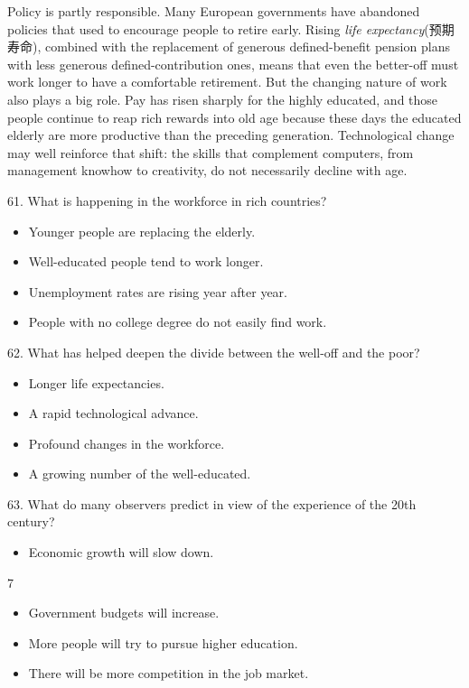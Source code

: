 \documentclass[UTF8,11pt]{ctexart}
\begin{document}
Policy is partly responsible. Many European governments have abandoned policies that used to encourage people to retire early. Rising\textit{ life expectancy}(预期寿命), combined with the replacement of generous defined-benefit pension plans with less generous defined-contribution ones, means that even the better-off must work longer to have a comfortable retirement. But the changing nature of work also plays a big role. Pay has risen sharply for the highly educated, and those people continue to reap rich rewards into old age because these days the educated elderly are more productive than the preceding generation. Technological change may well reinforce that shift: the skills that complement computers, from management knowhow to creativity, do not necessarily decline with age.


61. What is happening in the workforce in rich countries?


\begin{itemize}[leftmargin=2em,itemsep=.2em,topsep=.4em]\item[A.] Younger people are replacing the elderly.
\item[B.] Well-educated people tend to work longer.
\item[C.] Unemployment rates are rising year after year.
\item[D.] People with no college degree do not easily find work.
\end{itemize}

62. What has helped deepen the divide between the well-off and the poor?


\begin{itemize}[leftmargin=2em,itemsep=.2em,topsep=.4em]\item[A.] Longer life expectancies.
\item[B.] A rapid technological advance.
\item[C.] Profound changes in the workforce.
\item[D.] A growing number of the well-educated.
\end{itemize}

63. What do many observers predict in view of the experience of the 20th century?


\begin{itemize}[leftmargin=2em,itemsep=.2em,topsep=.4em]\item[A.] Economic growth will slow down.
\end{itemize}

7


\begin{itemize}[leftmargin=2em,itemsep=.2em,topsep=.4em]\item[B.] Government budgets will increase.
\item[C.] More people will try to pursue higher education.
\item[D.] There will be more competition in the job market.
\end{itemize}
\end{document}
